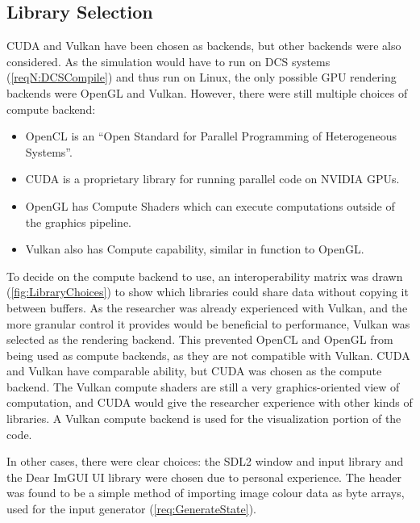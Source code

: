 \subsection{Library Selection}
\label{sec:LibrarySelection}

CUDA and Vulkan have been chosen as backends, but other backends were also considered.
As the simulation would have to run on DCS systems (\cref{reqN:DCSCompile}) and thus run on Linux, the only possible GPU rendering backends were OpenGL and Vulkan.
However, there were still multiple choices of compute backend:
\begin{itemize}
    \item OpenCL\cite{tool:OpenCL1.0PressRelease} is an ``Open Standard for Parallel Programming of Heterogeneous Systems''\cite{TheKhronosGroupOpenCLInc}.
    \item CUDA\cite{tool:CUDA} is a proprietary library for running parallel code on NVIDIA GPUs.
    \item OpenGL has Compute Shaders\cite{tool:OpenGLComputeShaderExt} which can execute computations outside of the graphics pipeline.
    \item Vulkan also has Compute capability\cite{TheKhronosGroupVulkanGuide}, similar in function to OpenGL.
\end{itemize}
To decide on the compute backend to use, an interoperability matrix was drawn (\cref{fig:LibraryChoices}) to show which libraries could share data without copying it between buffers.
As the researcher was already experienced with Vulkan, and the more granular control it provides would be beneficial to performance, Vulkan was selected as the rendering backend.
This prevented OpenCL and OpenGL from being used as compute backends, as they are not compatible with Vulkan.
CUDA and Vulkan have comparable ability, but CUDA was chosen as the compute backend.
The Vulkan compute shaders are still a very graphics-oriented view of computation, and CUDA would give the researcher experience with other kinds of libraries.
A Vulkan compute backend is used for the visualization portion of the code.


In other cases, there were clear choices: the SDL2\cite{SimpleHomepage} window and input library and the Dear ImGUI\cite{CornutDearImGui} UI library were chosen due to personal experience.
The  header was found to be a simple method of importing image colour data as byte arrays, used for the input generator (\cref{req:GenerateState}).

